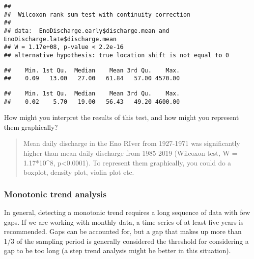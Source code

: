 \documentclass[
]{article}
\newenvironment{Shaded}{\begin{snugshade}}{\end{snugshade}}
\newcommand{\KeywordTok}[1]{\textcolor[rgb]{0.13,0.29,0.53}{\textbf{#1}}}
\newcommand{\NormalTok}[1]{#1}
\newcommand{\OperatorTok}[1]{\textcolor[rgb]{0.81,0.36,0.00}{\textbf{#1}}}
\begin{document}
\begin{verbatim}
## 
##  Wilcoxon rank sum test with continuity correction
## 
## data:  EnoDischarge.early$discharge.mean and EnoDischarge.late$discharge.mean
## W = 1.17e+08, p-value < 2.2e-16
## alternative hypothesis: true location shift is not equal to 0
\end{verbatim}

\begin{Shaded}
\end{Shaded}

\begin{verbatim}
##    Min. 1st Qu.  Median    Mean 3rd Qu.    Max. 
##    0.09   13.00   27.00   61.84   57.00 4570.00
\end{verbatim}

\begin{Shaded}
\end{Shaded}

\begin{verbatim}
##    Min. 1st Qu.  Median    Mean 3rd Qu.    Max. 
##    0.02    5.70   19.00   56.43   49.20 4600.00
\end{verbatim}

How might you interpret the results of this test, and how might you
represent them graphically?

\begin{quote}
Mean daily discharge in the Eno RIver from 1927-1971 was significantly
higher than mean daily discharge from 1985-2019 (Wilcoxon test, W =
1.17*10\^{}8, p\textless0.0001). To represent them graphically, you
could do a boxplot, density plot, violin plot etc.
\end{quote}

\hypertarget{monotonic-trend-analysis}{%
\subsubsection{Monotonic trend
analysis}\label{monotonic-trend-analysis}}

In general, detecting a monotonic trend requires a long sequence of data
with few gaps. If we are working with monthly data, a time series of at
least five years is recommended. Gaps can be accounted for, but a gap
that makes up more than 1/3 of the sampling period is generally
considered the threshold for considering a gap to be too long (a step
trend analysis might be better in this situation).
\end{document}
